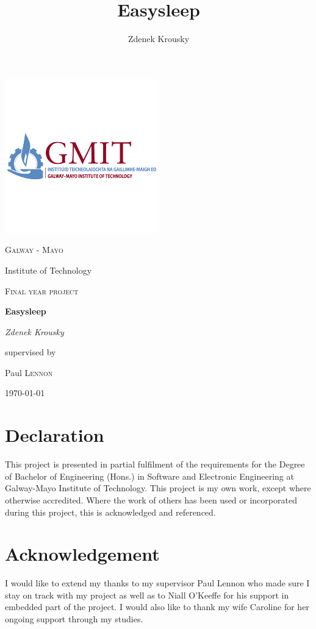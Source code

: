 \documentclass[12pt,a4paper]{article}
\author{Zdenek Krousky}
\title{Easysleep}
\begin{document}
	\begin{titlepage}
		\centering
		\includegraphics[width=0.5\textwidth]{gmit_full1.png}\par\vspace{0cm}
		{\scshape\LARGE Galway - Mayo \par Institute of Technology \par}
		\vspace{1cm}
		{\scshape\Large Final year project\par}
		\vspace{1.5cm}
		{\Huge\bfseries Easysleep\par}
		\vspace{2cm}
		{\Large\itshape Zdenek Krousky\par}
		\vfill
		supervised by\par
		Paul \textsc{Lennon}
		
		\vfill
		
		{\large \today\par}
	\end{titlepage}
	
	\newpage
	\newpage
	
	\section*{Declaration}
	This project is presented in partial fulfilment of the requirements for the Degree of Bachelor of Engineering (Hons.) in Software and Electronic Engineering at Galway-Mayo Institute of Technology. This project is my own work, except where otherwise accredited. Where the work of others has been used or incorporated during this project, this is acknowledged and referenced.
	\newpage
	
	\section*{Acknowledgement}
	I would like to extend my thanks to my supervisor Paul Lennon who made sure I stay on track with my project as well as to Niall O'Keeffe for his support in embedded part of the project. I would also like to thank my wife Caroline for her ongoing support through my studies.
	\newpage
	\tableofcontents
	\newpage
	
\end{document}
